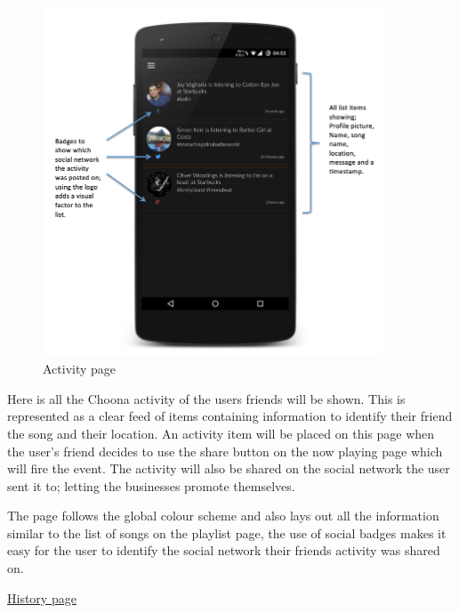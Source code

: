 \noindent
\begin{figure}[h!]
\centering
\includegraphics[width=0.9\textwidth]{./img/activityannotated.png}
\caption{Activity page}
\label{fig:activitypage}
\end{figure}

Here is all the Choona activity of the users friends will be shown. This is represented as a clear feed of items containing information to identify their friend the song and their location. An activity item will be placed on this page when the user's friend decides to use the share button on the now playing page which will fire the event. The activity will also be shared on the social network the user sent it to; letting the businesses promote themselves. 

The page follows the global colour scheme and also lays out all the information similar to the list of songs on the playlist page, the use of social badges makes it easy for the user to identify the social network their friends activity was shared on. 
\clearpage

\noindent\underline{History page}\newline

